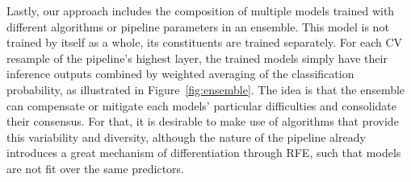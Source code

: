 Lastly, our approach includes the composition of multiple models trained with different algorithms or pipeline parameters in an ensemble.
This model is not trained by itself as a whole, its constituents are trained separately.
For each CV resample of the pipeline's highest layer, the trained models simply have their inference outputs combined by weighted averaging of the classification probability, as illustrated in Figure~\ref{fig:ensemble}.
The idea is that the ensemble can compensate or mitigate each models' particular difficulties and consolidate their consensus.
For that, it is desirable to make use of algorithms that provide this variability and diversity, although the nature of the pipeline already introduces a great mechanism of differentiation through RFE, such that models are not fit over the same predictors.


